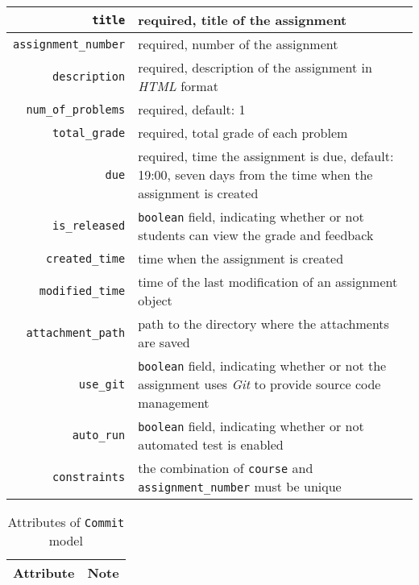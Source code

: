 \begin{itemize}
\begin{table}[H]
\begin{tabular}[ht]{r|p{4in}}
        \texttt{title} & required, title of the assignment\\
        \hline
        \texttt{assignment\_number} & required, number of the assignment\\
        \hline
        \texttt{description} & required, description of the assignment 
            in \emph{HTML} format \\
        \hline
        \texttt{num\_of\_problems} & required, default: 1 \\
        \hline
        \texttt{total\_grade} & required, total grade of each problem \\
        \hline
        \texttt{due} & required, time the assignment is due, default: 19:00,
            seven days  from the time when the assignment is created \\
        \hline
        \texttt{is\_released} & \texttt{boolean} field, indicating whether or not
            students can view the grade and feedback \\
        \hline
        \texttt{created\_time} & time when the assignment is created \\
        \hline
        \texttt{modified\_time} & time of the last modification of an assignment
            object\\
        \hline
        \texttt{attachment\_path} & path to the directory where the attachments
            are saved \\
        \hline
        \hline

        \texttt{use\_git} & \texttt{boolean} field, indicating whether or not
            the  assignment uses \emph{Git} to provide source code management \\
        \hline
        \texttt{auto\_run} & \texttt{boolean} field, indicating whether or not
            automated test  is enabled \\
        \hline
        \hline

        \texttt{constraints} & the combination of \texttt{course} and \texttt{assignment\_number}
            must  be unique \\
        \hline
    \end{tabular}
    \renewcommand{\arraystretch}{1}
\end{table}

\begin{table}[ht]
    \centering
    \caption{Attributes of \texttt{Commit} model}
    \label{tab:COMMIT_ATTR}
    \renewcommand{\arraystretch}{1.3}
    \begin{tabular}[ht]{r|p{4in}}
        \hline
        Attribute & Note \\
        \hline
        \hline


\end{tabular}
\end{table}
\end{itemize}

